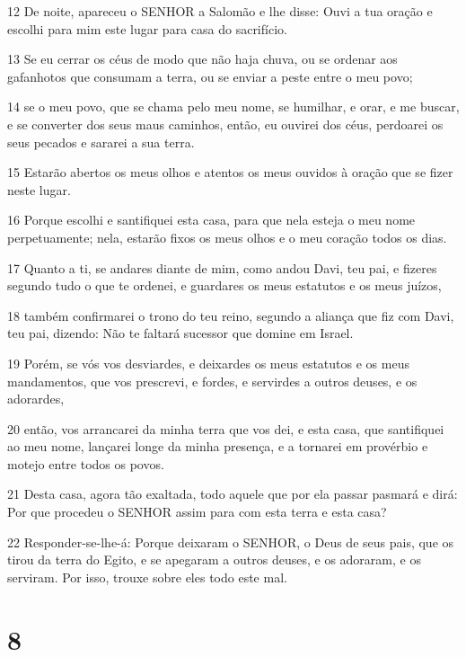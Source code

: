 \par 12 De noite, apareceu o SENHOR a Salomão e lhe disse: Ouvi a tua oração e escolhi para mim este lugar para casa do sacrifício.
\par 13 Se eu cerrar os céus de modo que não haja chuva, ou se ordenar aos gafanhotos que consumam a terra, ou se enviar a peste entre o meu povo;
\par 14 se o meu povo, que se chama pelo meu nome, se humilhar, e orar, e me buscar, e se converter dos seus maus caminhos, então, eu ouvirei dos céus, perdoarei os seus pecados e sararei a sua terra.
\par 15 Estarão abertos os meus olhos e atentos os meus ouvidos à oração que se fizer neste lugar.
\par 16 Porque escolhi e santifiquei esta casa, para que nela esteja o meu nome perpetuamente; nela, estarão fixos os meus olhos e o meu coração todos os dias.
\par 17 Quanto a ti, se andares diante de mim, como andou Davi, teu pai, e fizeres segundo tudo o que te ordenei, e guardares os meus estatutos e os meus juízos,
\par 18 também confirmarei o trono do teu reino, segundo a aliança que fiz com Davi, teu pai, dizendo: Não te faltará sucessor que domine em Israel.
\par 19 Porém, se vós vos desviardes, e deixardes os meus estatutos e os meus mandamentos, que vos prescrevi, e fordes, e servirdes a outros deuses, e os adorardes,
\par 20 então, vos arrancarei da minha terra que vos dei, e esta casa, que santifiquei ao meu nome, lançarei longe da minha presença, e a tornarei em provérbio e motejo entre todos os povos.
\par 21 Desta casa, agora tão exaltada, todo aquele que por ela passar pasmará e dirá: Por que procedeu o SENHOR assim para com esta terra e esta casa?
\par 22 Responder-se-lhe-á: Porque deixaram o SENHOR, o Deus de seus pais, que os tirou da terra do Egito, e se apegaram a outros deuses, e os adoraram, e os serviram. Por isso, trouxe sobre eles todo este mal.

\chapter{8}

